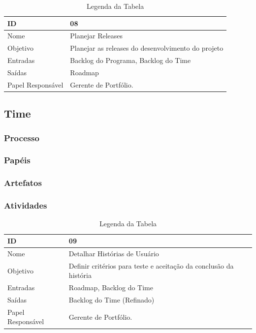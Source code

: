   \begin{table}[H]
    \centering
      \begin{tabular}{| m{5em} | m{10cm} |}
        \hline
        ID       & 08   \\ \hline
        Nome     & Planejar Releases  \\ \hline
        Objetivo & Planejar as releases do desenvolvimento do projeto \\ \hline
        Entradas & Backlog do Programa, Backlog do Time\\ \hline
        Saídas   & Roadmap \\ \hline
        Papel Responsável   & Gerente de Portfólio. \\ \hline
      \end{tabular}
      \caption{Legenda da Tabela}
      \label{tabela:atividade8}
  \end{table}

  \subsection{Time}
  \subsubsection{Processo}
  \subsubsection{Papéis}
  \subsubsection{Artefatos}
  \subsubsection{Atividades}

  \begin{table}[H]
    \centering
      \begin{tabular}{| m{5em} | m{10cm} |}
        \hline
        ID       & 09   \\ \hline
        Nome     & Detalhar Histórias de Usuário  \\ \hline
        Objetivo & Definir critérios para teste e aceitação da conclusão da história  \\ \hline
        Entradas & Roadmap, Backlog do Time\\ \hline
        Saídas   & Backlog do Time (Refinado) \\ \hline
        Papel Responsável   & Gerente de Portfólio. \\ \hline
      \end{tabular}
      \caption{Legenda da Tabela}
      \label{tabela:atividade9}
  \end{table}

